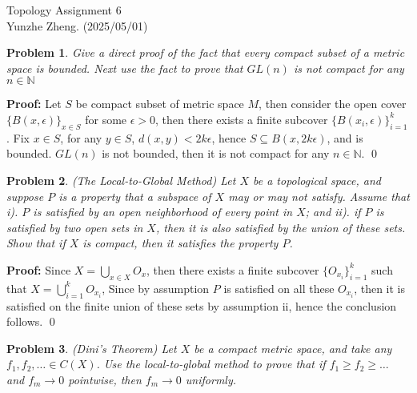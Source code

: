 \documentclass[12pt]{article}
\newtheorem{problem}{Problem}
\begin{document}
\noindent Topology \hfill Assignment 6\\
Yunzhe Zheng. (2025/05/01)

\hrulefill

\begin{problem}
Give a direct proof of the fact that every compact subset of a metric space is bounded. Next use the fact to prove that $GL(n)$ is not compact for any $n\in\mathbb{N}$
\end{problem}

\textbf{Proof:} Let $S$ be compact subset of metric space $M$, then consider the open cover $\{B(x,\epsilon)\}_{x\in S}$ for some $\epsilon>0$, then there exists a finite subcover $\{B(x_i,\epsilon)\}_{i=1}^{k}$. Fix $x\in S$, for any $y\in S$, $d(x,y)< 2k\epsilon$, hence $S\subseteq B(x,2k\epsilon)$, and is bounded. $GL(n)$ is not bounded, then it is not compact for any $n\in\mathbb{N}$. \qed
\\
\begin{problem}
(The Local-to-Global Method) Let $X$ be a topological space, and suppose $P$ is a property that a subspace of $X$ may or may not satisfy. Assume that i). $P$ is satisfied by an open neighborhood of every point in $X$; and ii). if $P$ is satisfied by two open sets in $X$, then it is also satisfied by the union of these sets. Show that if $X$ is compact, then it satisfies the property $P$.
\end{problem}

\textbf{Proof:} Since $X=\bigcup_{x\in X} O_x$, then there exists a finite subcover $\{O_{x_i}\}_{i=1}^{k}$ such that $X=\bigcup_{i=1}^{k}O_{x_i}$, Since by assumption $P$ is satisfied on all these $O_{x_{i}}$, then it is satisfied on the finite union of these sets by assumption ii, hence the conclusion follows. \qed
\\
\begin{problem}
(Dini's Theorem) Let $X$ be a compact metric space, and take any $f_1, f_2, \dots\in C(X)$. Use the local-to-global method to prove that if $f_1\geq f_2\geq\dots$ and $f_m\to 0$ pointwise, then $f_m\to 0$ uniformly.
\end{problem}
\end{document}
